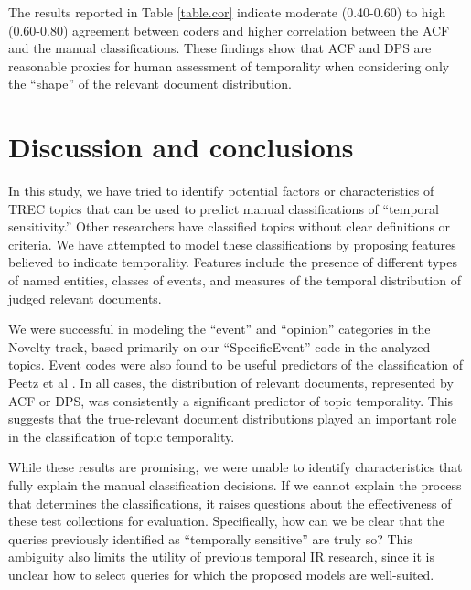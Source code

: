 \documentclass{asist}
\begin{document}
The results reported in Table \ref{table.cor} indicate moderate (0.40-0.60) to high (0.60-0.80) agreement between coders and higher correlation between the ACF and the manual classifications. These findings show that ACF and DPS are reasonable proxies for human assessment of temporality when considering only the ``shape'' of the relevant document distribution.



\section{Discussion and conclusions}

In this study, we have tried to identify potential factors or characteristics of TREC topics that can be used to predict manual classifications of ``temporal sensitivity.'' Other researchers have classified topics without clear definitions or criteria. We have attempted to model these classifications by proposing features believed to indicate temporality.  Features include the presence of different types of named entities, classes of events, and measures of the temporal distribution of judged relevant documents.

We were successful in modeling the ``event'' and ``opinion'' categories in the Novelty track, based primarily on our ``SpecificEvent'' code in the analyzed topics.  Event codes were also found to be useful predictors of the classification of Peetz et al \cite{Peetz2013a}. In all cases, the distribution of relevant documents, represented by ACF or DPS, was consistently a significant predictor of topic temporality. This suggests that the true-relevant document distributions played an important role in the classification of topic temporality.

While these results are promising, we were unable to identify characteristics that fully explain the manual classification decisions. If we cannot explain the process that determines the classifications, it raises questions about the effectiveness of these test collections for evaluation. Specifically, how can we be clear that the queries previously identified as ``temporally sensitive'' are truly so? This ambiguity also limits the utility of previous temporal IR research, since it is unclear how to select queries for which the proposed models are well-suited.
\end{document}
